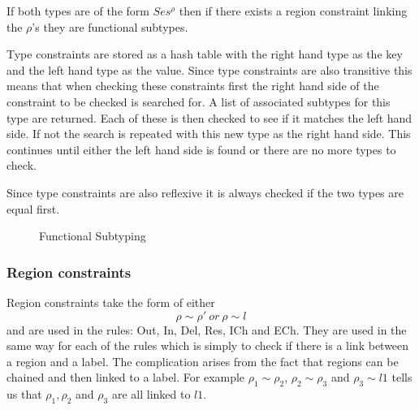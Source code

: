 If both types are of the form $Ses^{\rho}$ then if there exists a region constraint linking the $\rho$'s  they are functional subtypes.

Type constraints are stored as a hash table with the right hand type as the key and the left hand type as the value. Since type constraints are also transitive this means that when checking these constraints first the right hand side of the constraint to be checked is searched for. A list of associated subtypes for this type are returned. Each of these is then checked to see if it matches the left hand side. If not the search is repeated with this new type as the right hand side. This continues until either the left hand side is found or there are no more types to check.

Since type constraints are also reflexive it is  always checked if the two types are equal first.

\begin{figure}
\begin{myequation}
 \;
  \;
\end{myequation}
\begin{myequation}
 \;
  \;
\end{myequation}
\caption{Functional Subtyping}
\label{funcSubtype}
\end{figure}

\subsubsection{Region constraints}

Region constraints take the form of either $$\rho \sim \rho' \ or\  \rho \sim l$$ and are used in the rules: Out, In, Del, Res, ICh and ECh. They are used in the same way for each of the rules which is simply to check if there is a link between a region and a label. The complication arises from the fact that regions can be chained and then linked to a label. For example $\rho_1 \sim \rho_2$, $\rho_2 \sim \rho_3$ and $\rho_3 \sim l1$ tells us that $\rho_1,\rho_2$ and $\rho_3$ are all linked to $l1$.

